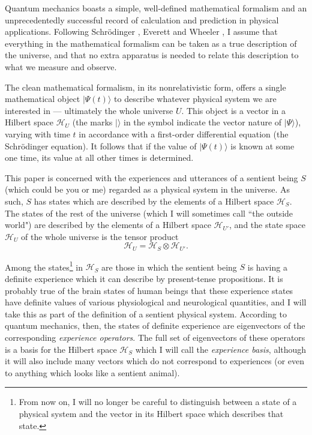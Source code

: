 \documentclass[12pt,a4paper,reqno]{article}
\renewcommand{\(}{\left(}
\renewcommand{\)}{\right)}
\renewcommand{\H}{\mathcal{H}}
\newcommand{\<}{\langle}
\renewcommand{\>}{\rangle}
\theoremstyle{plain} %
\begin{document}
Quantum mechanics boasts a simple, well-defined mathematical formalism and an unprecedentedly successful record of calculation and prediction in physical applications. Following Schr\"odinger \cite{Schrodinger:interpretns}, Everett \cite{Everett} and Wheeler \cite{Wheeler}, I assume that everything in the mathematical formalism can be taken as a true description of the universe, and that no extra apparatus is needed to relate this description to what we measure and observe.

The clean mathematical formalism, in its nonrelativistic form, offers a single mathematical object $|\Psi(t)\>$ to describe whatever physical system we are interested in --- ultimately the whole universe $U$. This object is a vector in a Hilbert space $\H_U$ (the marks $|\>$ in the symbol indicate the vector nature of $|\Psi\>$), varying with time $t$ in accordance with a first-order differential equation (the Schr\"odinger equation). It follows that if the value of $|\Psi(t)\>$ is known at some one time, its value at all other times is determined.

This paper is concerned with the experiences and utterances of a sentient being $S$ (which could be you or me) regarded as a physical system in the universe. As such, $S$ has states which are described by the elements of a Hilbert space $\H_S$. The states of the rest of the universe (which I will sometimes call ``the outside world") are described by the elements of a Hilbert space $\H_{U'}$, and the state space $\H_U$ of the whole universe is the tensor product
\[
\H_U = \H_S \otimes \H_{U'}.
\]

Among the states\footnote{From now on, I will no longer be careful to distinguish between a state of a physical system and the vector in its Hilbert space which describes that state.}  in $\H_S$ are those in which the sentient being $S$ is having a definite experience which it can describe by present-tense propositions. It is probably true \cite{Tegmark} of the brain states of human beings that these experience states have definite values of various physiological and neurological quantities, and I will take this as part of the definition of a sentient physical system. According to quantum mechanics, then, the states of definite experience are eigenvectors of the corresponding \emph{experience operators}. The full set of eigenvectors of these operators is a basis for the Hilbert space $\H_S$ which I will call the \emph{experience basis}, although it will also include many vectors which do not correspond to experiences (or even to anything which looks like a sentient animal).
\end{document}
